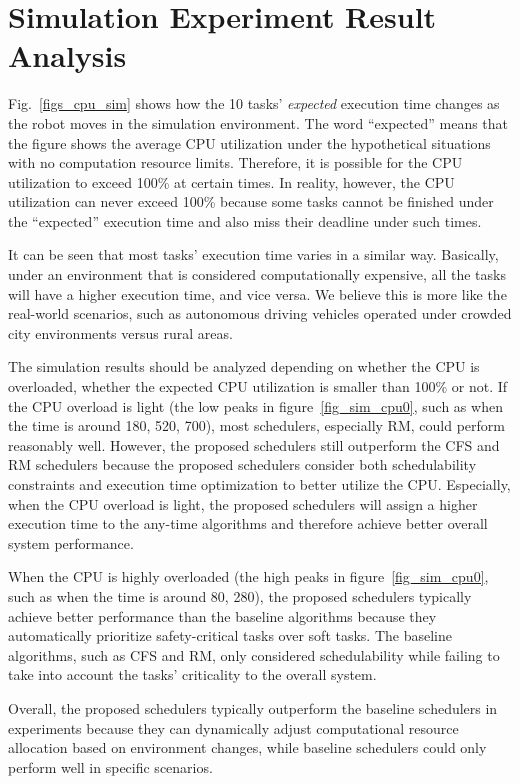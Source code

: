     \section{Simulation Experiment Result Analysis}
    \label{section: simulation_exp}
    
    Fig.~\ref{figs_cpu_sim} shows how the 10 tasks' \textit{expected} execution time changes as the robot moves in the simulation environment. 
    The word ``expected'' means that the figure shows the average CPU utilization under the hypothetical situations with no computation resource limits. Therefore, it is possible for the CPU utilization to exceed 100\% at certain times. In reality, however, the CPU utilization can never exceed 100\% because some tasks cannot be finished under the ``expected'' execution time and also miss their deadline under such times.
    
    It can be seen that most tasks' execution time varies in a similar way. Basically, under an environment that is considered computationally expensive, all the tasks will have a higher execution time, and vice versa. We believe this is more like the real-world scenarios, such as autonomous driving vehicles operated under crowded city environments versus rural areas.

    The simulation results should be analyzed depending on whether the CPU is overloaded, \ie whether the expected CPU utilization is smaller than 100\% or not. If the CPU overload is light (\eg the low peaks in figure~\ref{fig_sim_cpu0}, such as when the time is around 180, 520, 700), most schedulers, especially RM, could perform reasonably well. However, the proposed schedulers still outperform the CFS and RM schedulers because the proposed schedulers consider both schedulability constraints and execution time optimization to better utilize the CPU. Especially, when the CPU overload is light, the proposed schedulers will assign a higher execution time to the any-time algorithms and therefore achieve better overall system performance.

    When the CPU is highly overloaded (\eg the high peaks in figure~\ref{fig_sim_cpu0}, such as when the time is around 80, 280), the proposed schedulers typically achieve better performance than the baseline algorithms because they automatically prioritize safety-critical tasks over soft tasks. The baseline algorithms, such as CFS and RM, only considered schedulability while failing to take into account the tasks' criticality to the overall system.

    Overall, the proposed schedulers typically outperform the baseline schedulers in experiments because they can dynamically adjust computational resource allocation based on environment changes, while baseline schedulers could only perform well in specific scenarios.
    
   